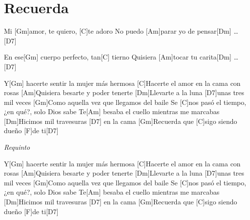 \section{Recuerda}

\noindent
\vspace{1cm}

\begin{guitar}
	\begin{multicols}{2}

		Mi [Gm]amor, te quiero, [C]te adoro
		No puedo [Am]parar yo de pensar[Dm] \dots [D7] \par
		En ese[Gm] cuerpo perfecto, tan[C] tierno
		Quisiera [Am]tocar tu carita[Dm] \dots [D7] \par
		Y[Gm] hacerte sentir la mujer más hermosa
		[C]Hacerte el amor en la cama con rosas
		[Am]Quisiera besarte y poder tenerte
		[Dm]Llevarte a la luna [D7]unas tres mil veces
		[Gm]Como aquella vez que llegamos del baile
		Se [C]nos pasó el tiempo, ¿en qué?, solo Dios sabe
		Te[Am] besaba el cuello mientras me marcabas
		[Dm]Hicimos mil travesuras [D7] en la cama
		[Gm]Recuerda que [C]sigo siendo dueño [F]de ti[D7] \par
		\par
		\textit{Requinto}
		\par
		Y[Gm] hacerte sentir la mujer más hermosa
		[C]Hacerte el amor en la cama con rosas
		[Am]Quisiera besarte y poder tenerte
		[Dm]Llevarte a la luna [D7]unas tres mil veces
		[Gm]Como aquella vez que llegamos del baile
		Se [C]nos pasó el tiempo, ¿en qué?, solo Dios sabe
		Te[Am] besaba el cuello mientras me marcabas
		[Dm]Hicimos mil travesuras [D7] en la cama
		[Gm]Recuerda que [C]sigo siendo dueño [F]de ti[D7] \par
	
	\end{multicols}
\end{guitar}
